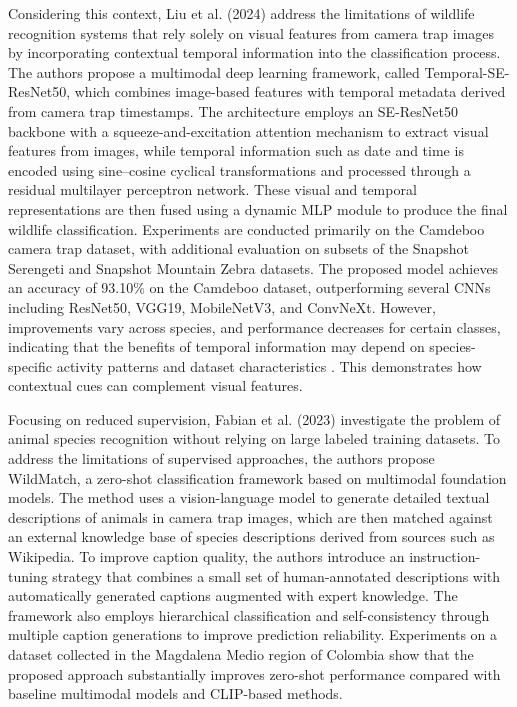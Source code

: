 Considering this context, Liu et al. (2024) \citep{liu2024improved} address the limitations of wildlife recognition systems that rely solely on visual features from camera trap images by incorporating contextual temporal information into the classification process. The authors propose a multimodal deep learning framework, called Temporal-SE-ResNet50, which combines image-based features with temporal metadata derived from camera trap timestamps. The architecture employs an SE-ResNet50 backbone with a squeeze-and-excitation attention mechanism to extract visual features from images, while temporal information such as date and time is encoded using sine–cosine cyclical transformations and processed through a residual multilayer perceptron network. These visual and temporal representations are then fused using a dynamic MLP module to produce the final wildlife classification. Experiments are conducted primarily on the Camdeboo camera trap dataset, with additional evaluation on subsets of the Snapshot Serengeti and Snapshot Mountain Zebra datasets. The proposed model achieves an accuracy of 93.10\% on the Camdeboo dataset, outperforming several CNNs including ResNet50, VGG19, MobileNetV3, and ConvNeXt. However, improvements vary across species, and performance decreases for certain classes, indicating that the benefits of temporal information may depend on species-specific activity patterns and dataset characteristics \citep{liu2024improved}. This demonstrates how contextual cues can complement visual features.

Focusing on reduced supervision, Fabian et al. (2023) \citep{fabian2023multimodal} investigate the problem of animal species recognition without relying on large labeled training datasets. To address the limitations of supervised approaches, the authors propose WildMatch, a zero-shot classification framework based on multimodal foundation models. The method uses a vision-language model to generate detailed textual descriptions of animals in camera trap images, which are then matched against an external knowledge base of species descriptions derived from sources such as Wikipedia. To improve caption quality, the authors introduce an instruction-tuning strategy that combines a small set of human-annotated descriptions with automatically generated captions augmented with expert knowledge. The framework also employs hierarchical classification and self-consistency through multiple caption generations to improve prediction reliability. Experiments on a dataset collected in the Magdalena Medio region of Colombia show that the proposed approach substantially improves zero-shot performance compared with baseline multimodal models and CLIP-based methods.

